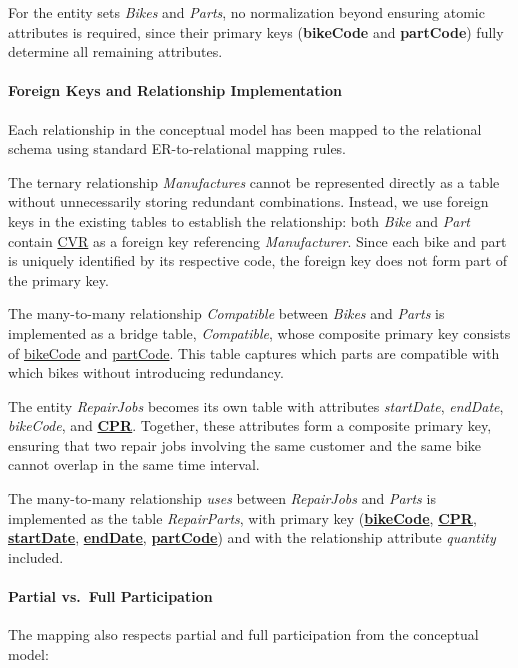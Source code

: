 \documentclass[dtu]{dtuarticle}
\begin{document}
For the entity sets \textit{Bikes} and \textit{Parts}, no normalization beyond ensuring atomic attributes is required, since their primary keys (\textbf{bikeCode} and \textbf{partCode}) fully determine all remaining attributes.

\paragraph{Foreign Keys and Relationship Implementation}
Each relationship in the conceptual model has been mapped to the relational schema using standard ER-to-relational mapping rules.

The ternary relationship \textit{Manufactures} cannot be represented directly as a table without unnecessarily storing redundant combinations. Instead, we use foreign keys in the existing tables to establish the relationship: both \textit{Bike} and \textit{Part} contain \underline{CVR} as a foreign key referencing \textit{Manufacturer}. Since each bike and part is uniquely identified by its respective code, the foreign key does not form part of the primary key.

The many-to-many relationship \textit{Compatible} between \textit{Bikes} and \textit{Parts} is implemented as a bridge table, \textit{Compatible}, whose composite primary key consists of \underline{bikeCode} and \underline{partCode}. This table captures which parts are compatible with which bikes without introducing redundancy.

The entity \textit{RepairJobs} becomes its own table with attributes \textit{startDate}, \textit{endDate}, \textit{bikeCode}, and \underline{\textbf{CPR}}. Together, these attributes form a composite primary key, ensuring that two repair jobs involving the same customer and the same bike cannot overlap in the same time interval. 

The many-to-many relationship \textit{uses} between \textit{RepairJobs} and \textit{Parts} is implemented as the table \textit{RepairParts}, with primary key (\underline{\textbf{bikeCode}}, \underline{\textbf{CPR}}, \underline{\textbf{startDate}}, \underline{\textbf{endDate}}, \underline{\textbf{partCode}}) and with the relationship attribute \textit{quantity} included.


\paragraph{Partial vs.\ Full Participation}
The mapping also respects partial and full participation from the conceptual model:
\end{document}
